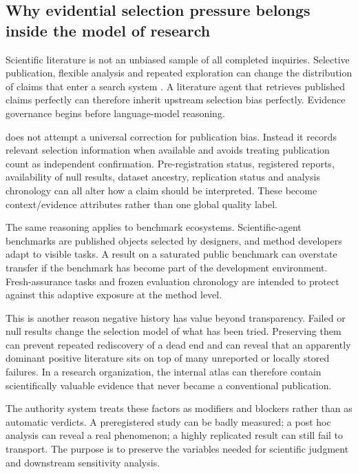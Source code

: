\subsection{Why evidential selection pressure belongs inside the model of research}

Scientific literature is not an unbiased sample of all completed inquiries. Selective publication, flexible analysis and repeated exploration can change the distribution of claims that enter a search system \cite{rosenthal1979,franco2014,ioannidis2005}. A literature agent that retrieves published claims perfectly can therefore inherit upstream selection bias perfectly. Evidence governance begins before language-model reasoning.

\RAKL{} does not attempt a universal correction for publication bias. Instead it records relevant selection information when available and avoids treating publication count as independent confirmation. Pre-registration status, registered reports, availability of null results, dataset ancestry, replication status and analysis chronology can all alter how a claim should be interpreted. These become context/evidence attributes rather than one global quality label.

The same reasoning applies to benchmark ecosystems. Scientific-agent benchmarks are published objects selected by designers, and method developers adapt to visible tasks. A result on a saturated public benchmark can overstate transfer if the benchmark has become part of the development environment. Fresh-assurance tasks and frozen evaluation chronology are intended to protect against this adaptive exposure at the method level.

This is another reason negative history has value beyond transparency. Failed or null results change the selection model of what has been tried. Preserving them can prevent repeated rediscovery of a dead end and can reveal that an apparently dominant positive literature sits on top of many unreported or locally stored failures. In a research organization, the internal atlas can therefore contain scientifically valuable evidence that never became a conventional publication.

The authority system treats these factors as modifiers and blockers rather than as automatic verdicts. A preregistered study can be badly measured; a post hoc analysis can reveal a real phenomenon; a highly replicated result can still fail to transport. The purpose is to preserve the variables needed for scientific judgment and downstream sensitivity analysis.

